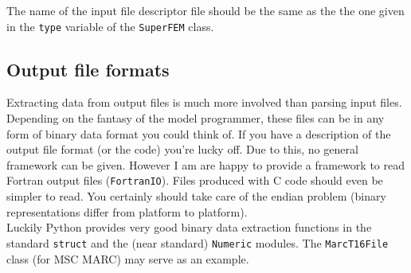 The name of the input file descriptor file should be the same as the the one
given in the \texttt{type} variable of the \texttt{SuperFEM} class.

\subsection{Output file formats}
\label{sec:output-file-formats}

Extracting data from output files is much more involved than parsing input
files. Depending on the fantasy of the model programmer, these files can be in
any form of binary data format you could think of. If you have a description
of the output file format (or the code) you're lucky off.  Due to this, no
general framework can be given. However I am are happy to provide a framework
to read Fortran output files (\texttt{FortranIO}). Files produced with C code
should even be simpler to read. You certainly should take care of the endian
problem (binary representations differ from platform to platform).\\

Luckily Python provides very good binary data extraction functions in the
standard \texttt{struct} and the (near standard) \texttt{Numeric} modules. The
\texttt{MarcT16File} class (for MSC MARC) may serve as an example.

